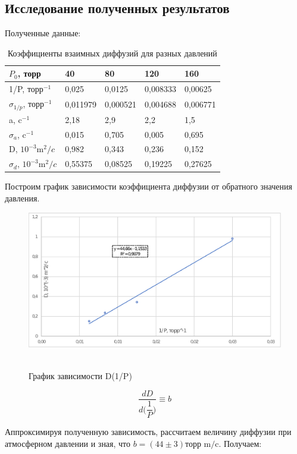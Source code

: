 \documentclass[a4paper,12pt]{article}
\theoremstyle{plain} %
\theoremstyle{definition} %
\theoremstyle{remark} %
\begin{document}
\subsection{Исследование полученных результатов}
Полученные данные:
\begin{table}[h!]
\centering
\caption{Коэффициенты взаимных диффузий для разных давлений}
\label{my-label}
\begin{tabular}{|l|l|l|l|l|}
\hline
$P_0$, торр                                              & 40       & 80       & 120      & 160      \\ \hline
1/P, $\text{торр}^{-1}$                               & 0,025    & 0,0125   & 0,008333 & 0,00625  \\ \hline
$\sigma_{1/p}$, $\text{торр}^{-1}$                     & 0,011979 & 0,000521 & 0,004688 & 0,006771 \\ \hline
a, $\text{c}^{-1}$                                & 2,18     & 2,9      & 2,2      & 1,5      \\ \hline
$\sigma_a$, $\text{c}^{-1}$                         & 0,015    & 0,705    & 0,005    & 0,695    \\ \hline
D, $10^{-3} \text{m}^2/c$        & 0,982    & 0,343    & 0,236    & 0,152    \\ \hline
$\sigma_d$, $10^{-3} \text{m}^{2}/c$ & 0,55375  & 0,08525  & 0,19225  & 0,27625  \\ \hline
\end{tabular}
\end{table}

Построим график зависимости коэффициента диффузии от обратного значения давления.

\begin{figure}[H]
{\includegraphics[width=0.7\linewidth]{finalGraph.eps}}\ 
\caption{График зависимости D(1/P)}
\end{figure}

\[\frac{dD}{d\Big(\dfrac{1}{P} \Big)} \equiv b\]

Аппроксимируя полученную зависимость, рассчитаем величину диффузии при атмосферном давлении и зная, что $b = (44 \pm 3) \text{торр m/c}$. Получаем:
\end{document}
